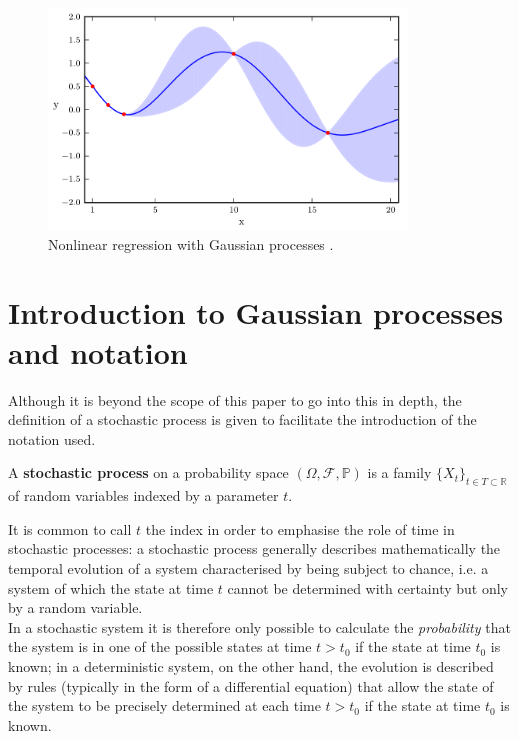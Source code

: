 \begin{oss}
\begin{figure}[h]
    \centering
    \includegraphics[width=0.85\textwidth]{images/Gaussian process/motivazione4.png}
    \caption{Nonlinear regression with Gaussian processes \cite{turner_gaussian_2016}.}
    \label{nonlinearRegressionGaussianProcess}
\end{figure}

\end{oss}

\newpage

\section{Introduction to Gaussian processes and notation}
Although it is beyond the scope of this paper to go into this in depth, the definition of a stochastic process is given to facilitate the introduction of the notation used.



\begin{defi}
  A \textbf{stochastic process} on a probability space $(\Omega, \mathcal{F}, \mathbb{P})$ is a family $\{X_t\}_{t\in T\subset \mathbb{R}}$ of random variables indexed by a parameter $t$.
\end{defi}



It is common to call $t$ the index in order to emphasise the role of time in stochastic processes: a stochastic process generally describes mathematically the temporal evolution of a system characterised by being subject to chance, i.e. a system of which the state at time $t$ cannot be determined with certainty but only by a random variable.\\
In a stochastic system it is therefore only possible to calculate the \textit{probability} that the system is in one of the possible states at time $t>t_0$ if the state at time $t_0$ is known; in a deterministic system, on the other hand, the evolution is described by rules (typically in the form of a differential equation) that allow the state of the system to be precisely determined at each time $t>t_0$ if the state at time $t_0$ is known.





